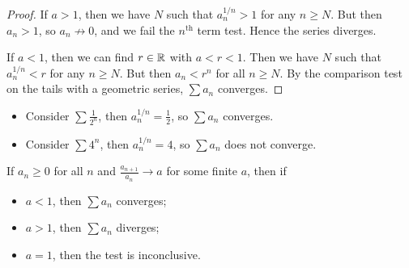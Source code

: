 \documentclass{../template/note}
\begin{document}
    \begin{proof}
        If \(a > 1\), then we have \(N\) such that \(a_n^{1/n} > 1\) for any \(n \geq N\). But then \(a_n > 1\), so \(a_n \not\to 0\), and we fail the \(n^\text{th}\) term test. Hence the series diverges.

        If \(a < 1\), then we can find \(r \in \mathbb R\) with \(a < r < 1\). Then we have \(N\) such that \(a_n^{1/n} < r\) for any \(n \geq N\). But then \(a_n < r^n\) for all \(n \geq N\). By the comparison test on the tails with a geometric series, \(\sum a_n\) converges.
    \end{proof}
    
    \begin{example}
        \begin{itemize}
            \item Consider \(\sum \frac 1{2^n}\), then \(a_n^{1/n} = \frac{1}{2}\), so \(\sum a_n\) converges.
            \item Consider \(\sum 4^n\), then \(a_n^{1/n} = 4\), so \(\sum a_n\) does not converge.
        \end{itemize}
    \end{example}

    \begin{proposition}
        If \(a_n \geq 0\) for all \(n\) and \(\frac{a_{n+1}}{a_n} \to a\) for some finite \(a\), then if
        \begin{itemize}
            \item \(a < 1\), then \(\sum a_n\) converges;
            \item \(a > 1\), then \(\sum a_n\) diverges;
            \item \(a = 1\), then the test is inconclusive.
        \end{itemize}
    \end{proposition}
    
\end{document}
